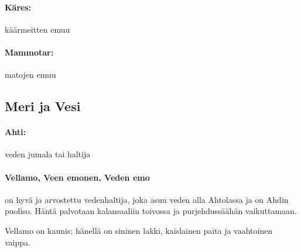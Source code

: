     \paragraph{Käres:} käärmeitten emuu
    \paragraph{Mammotar:} matojen emuu


\subsection{Meri ja Vesi}

  \paragraph{Ahti:} veden jumala tai haltija
  \paragraph{Vellamo, Veen emonen, Veden emo} on hyvä ja arvostettu vedenhaltija, joka asuu veden
    alla Ahtolassa ja on Ahdin puoliso. Häntä palvotaan kalansaaliin toivossa ja purjehdussäähän
    vaikuttamaan. \par
    Vellamo on kaunis; hänellä on sininen lakki, kaislainen paita ja vaahtoinen vaippa.
